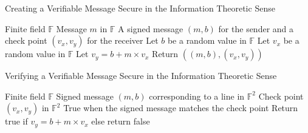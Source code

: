 \documentclass{dalcsthesis}
\begin{document}
\begin{algorithm}
  \caption{Creating a Verifiable Message Secure in the Information Theoretic Sense}
  \label{alg:CreatingVerifiableMessageForUnbounded}
  \begin{algorithmic}
    \INPUT Finite field $\mathbb{F}$
    \INPUT Message $m$ in $\mathbb{F}$
    \OUTPUT A signed message $(m, b)$ for the sender and a check point $(v_x, v_y)$ for the receiver
    \STATE Let $b$ be a random value in $\mathbb{F}$ 
    \STATE Let $v_x$ be a random value in $\mathbb{F}$
    \STATE Let $v_y = b + m \times v_x$
    \STATE Return $((m, b), (v_x, v_y))$
  \end{algorithmic}
\end{algorithm}
\begin{algorithm}
  \caption{Verifying a Verifiable Message Secure in the Information Theoretic Sense}
  \label{alg:VerifyMessageForUnbounded}
  \begin{algorithmic}
    \INPUT Finite field $\mathbb{F}$
    \INPUT Signed message $(m, b)$ corresponding to a line in $\mathbb{F}^2$
    \INPUT Check point $(v_x, v_y)$ in $\mathbb{F}^2$
    \OUTPUT True when the signed message matches the check point
    \STATE Return true if $v_y = b + m \times v_x$ else return false
  \end{algorithmic}
\end{algorithm}
\end{document}
